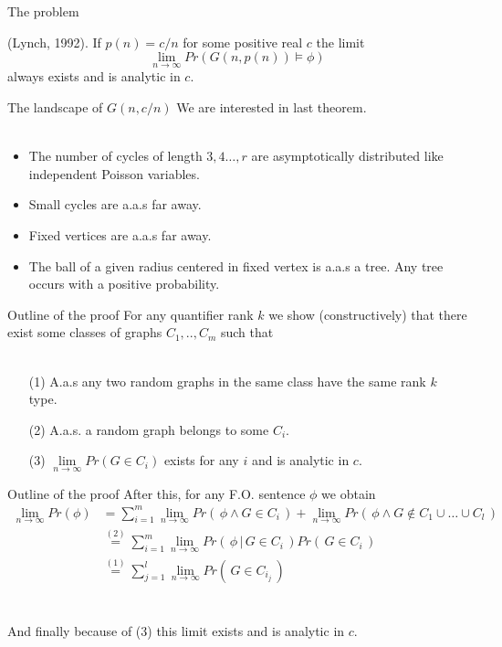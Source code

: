 \documentclass[handout, 11pt]{beamer}
\newcommand{\Ln}{\lim\limits_{n\to \infty}}
\begin{document}
\begin{frame}{The problem}
\begin{theorem}{(Lynch, 1992).} 
	If $p(n)=c/n$ for some positive real $c$
	the limit
	\[ \Ln Pr(G(n,p(n))\models \phi)\]
	always exists and is analytic in $c$.  
\end{theorem}
\end{frame}

\begin{frame}{The landscape of $G(n,c/n)$}
	We are interested in last theorem.\\~\\
	\begin{itemize}
		\item The number of cycles of 
		length $3,4\dots, r$
		are asymptotically distributed like independent Poisson 
		variables.
		\item Small cycles are a.a.s far away.
		\item Fixed vertices are a.a.s far away.
		\item The ball of a given radius centered in fixed
		vertex is a.a.s a tree. Any tree occurs with a positive 
		probability.
	\end{itemize}
\end{frame}

\begin{frame}{Outline of the proof}
	For any quantifier rank $k$ we show (constructively) that there exist
	some classes of graphs $C_1,.., C_m$ such that \\~\\
	\begin{itemize}
		\item[(1)] A.a.s any two random graphs in the same class
		have the same rank $k$ type.
		\item[(2)] A.a.s. a random graph belongs to some $C_i$.
		\item[(3)] $\Ln Pr(G\in C_i)$ exists for any $i$ and is
		analytic in $c$.
	\end{itemize}  
	
\end{frame}
\begin{frame}{Outline of the proof}
	After this, for any F.O. sentence $\phi$ we obtain
	\\
	\begin{align*}
	 \Ln Pr(\phi) &= \sum_{i=1}^{m} \Ln Pr(\, \phi \wedge G\in C_i \,) + 
	  \Ln Pr(\, \phi \wedge G\notin C_1\cup \dots \cup C_l \,) \\
	 & \stackrel{(2)}{=} \sum_{i=1}^{m} \Ln Pr(\, \phi \, |\, G\in C_i \,)Pr( \, G\in C_i \,) \\
	 & \stackrel{(1)}{=} \sum_{j=1}^{l} \Ln Pr(\,G \in C_{i_j} \,)
	\end{align*}
	\\~\\
	And finally because of (3) this limit exists and is analytic in $c$.	
\end{frame}
\end{document}
